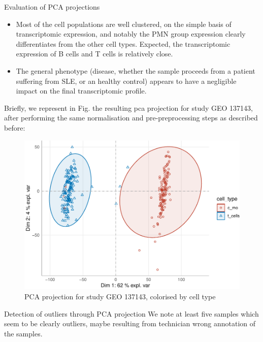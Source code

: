 \begin{conclusion}{Evaluation of PCA projections}

\begin{itemize}
\item
  Most of the cell populations are well clustered, on the simple basis of transcriptomic expression, and notably the PMN group expression clearly differentiates from the other cell types. Expected, the transcriptomic expression of B cells and T cells is relatively close.
\item
  The general phenotype (disease, whether the sample proceeds from a patient suffering from SLE, or an healthy control) appears to have a negligible impact on the final transcriptomic profile.
\end{itemize}

\end{conclusion}

Briefly, we represent in Fig.  the resulting pca projection for study GEO 137143, after performing the same normalisation and pre-preprocessing steps as described before:

\begin{figure}

{\centering \includegraphics[width=0.7\linewidth]{figure-latex/pca-gse137143-1} 

}

\caption{PCA projection for study GEO 137143, colorised by cell type}\label{fig:pca-gse137143}
\end{figure}

\begin{warning}{Detection of outliers through PCA projection}
We note at least five samples which seem to be clearly outliers, maybe resulting from technician wrong annotation of the samples. 

\end{warning}



